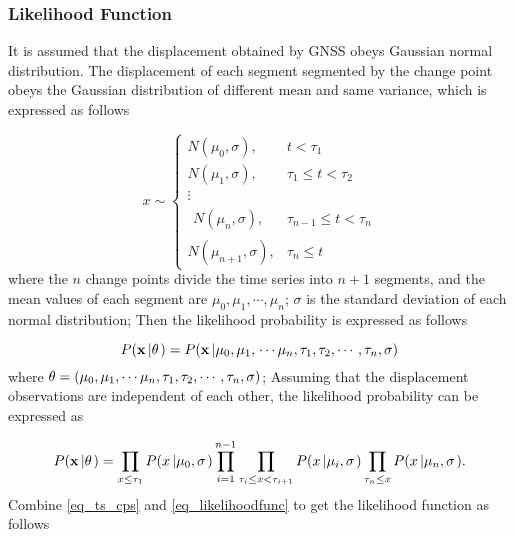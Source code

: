 \documentclass{svjour3}                     %
\begin{document}
\subsubsection{Likelihood Function}
It is assumed that the displacement obtained by GNSS obeys Gaussian normal distribution. The displacement of each segment segmented by the change point obeys the Gaussian distribution of different mean and same variance, which is expressed as follows

\begin{equation}\label{eq_ts_cps}
x \sim \left\{ {\begin{array}{*{20}{r}}
	{N({\mu _0},\sigma ),}&{t < {\tau _1}}\\
	{N({\mu _1},\sigma ),}&{{\tau _1} \le t < {\tau _2}}\\
	\vdots &{}\\
	{\begin{array}{*{20}{c}}
		{N({\mu _n},\sigma ),}
		\end{array}}&{{\tau _{n - 1}} \le t < {\tau _n}}\\
	{N({\mu _{n + 1}},\sigma ),}&{{\tau _n} \le t}
	\end{array}} \right.
\end{equation}
where the $n$ change points divide the time series into $n+1$ segments, and the mean values of each segment are ${\mu _0},{\mu _1},\cdots,{\mu _n}$; $\sigma$ is the standard deviation of each normal distribution; Then the likelihood probability is expressed as follows

\begin{equation}\label{eq_likelihood}
P({\bf{x}}\left| {\bf{\theta }} \right.) = P({\bf{x}}\left| {{\mu_0},{\mu_1},} \right. \cdots {\mu_n},{\tau _1},{\tau _2}, \cdots ,{\tau _n},\sigma )
\end{equation}
where ${\bf{\theta }}=({{\mu_0},{\mu_1},} \cdots {\mu_n},{\tau _1},{\tau _2}, \cdots ,{\tau _n},\sigma) $; Assuming that the displacement observations are independent of each other, the likelihood probability can be expressed as

\begin{equation}\label{eq_likelihoodfunc}
P({\bf{x}}\left| {\bf{\theta }} \right.) = \prod\limits_{x \le {\tau _1}} {P(x\left| {{\mu_0},\sigma } \right.)} \prod\limits_{i = 1}^{n - 1} {\prod\limits_{{\tau _i} \le x < {\tau _{i + 1}}} {P(x\left| {{\mu_i},\sigma } \right.)} \prod\limits_{{\tau _n} \le x} {P(x\left| {{\mu_n},\sigma } \right.)} }.
\end{equation}
Combine \ref{eq_ts_cps} and \ref{eq_likelihoodfunc} to get the likelihood function as follows
\end{document}
